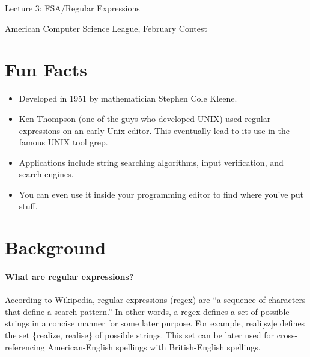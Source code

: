 \documentclass[10pt]{article}
\begin{document}
    \noindent
    \begin{center}

        \hrulefill

        \vspace{5pt}

        \vspace{0pt}

        {\Large \hfill  Lecture 3: FSA/Regular Expressions\hfill}
        \vspace{10pt}

        {\large \hfill  American Computer Science League, February Contest\hfill}
        \vspace{10pt}


        \vspace{-3pt}
        \hrulefill
    \end{center}

\section{Fun Facts}
\begin{itemize}
\item Developed in 1951 by mathematician Stephen Cole Kleene.
\item Ken Thompson (one of the guys who developed UNIX) used regular expressions on an early Unix editor.
This eventually lead to its use in the famous UNIX tool grep.
\item Applications include string searching algorithms,  input verification, and search engines.
\item You can even use it inside your programming editor to find where you've put stuff.
\end{itemize}

\section{Background}
\paragraph{What are regular expressions?}
According to Wikipedia, regular expressions (regex) are ``a sequence of characters that define a search pattern.''
In other words, a regex defines a set of possible strings in a concise manner for
some later purpose.
For example, reali[sz]e defines the set \{realize, realise\} of possible strings.
This set can be later used for cross-referencing American-English spellings with
British-English spellings.
\end{document}
